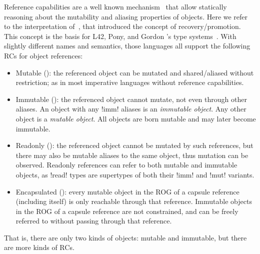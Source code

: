 Reference capabilities
 are a well known mechanism~\cite{TschantzErnst05,BirkaErnst04,OstlundEtAl08,clebsch2015deny,GianniniEtAl16,GordonEtAl12} that 
 allow statically reasoning about the mutability and aliasing properties of objects. Here we refer to the interpretation of~\cite{GordonEtAl12}, that introduced the concept of recovery/promotion. This concept is the basis for L42, Pony, and Gordon \etal's type systems~\cite{GordonEtAl12,ServettoEtAl13a,ServettoZucca15,clebsch2015deny,clebsch2017orca}. With slightly different names and semantics, those languages all support the following RCs for object references: %
\begin{itemize}

\item Mutable (\Q@mut@): the referenced object can be mutated and shared/aliased without restriction; as in most imperative languages without reference capabilities.

\item Immutable (\Q@imm@): the referenced object cannot mutate, not even through other aliases. An object with any \Q!imm! aliases is an \emph{immutable object}.
Any other object is a \emph{mutable object}.
All objects are born mutable and may later become immutable.

\item Readonly (\Q@read@): the referenced object cannot be mutated by such references, but there may also be mutable aliases to the same object, thus mutation can be observed. Readonly references can refer to both mutable and immutable objects, as \Q!read! types are supertypes of both their \Q!imm! and \Q!mut! variants.

\item Encapsulated (\Q@capsule@):
every mutable object in the ROG of a capsule reference (including itself) is only reachable through that reference. 
Immutable objects in the ROG of a capsule reference are not constrained, and can be freely referred to without passing through that reference. 
\end{itemize}
\noindent That is, there are only two kinds of objects: mutable and immutable, but there are more kinds of RCs.

